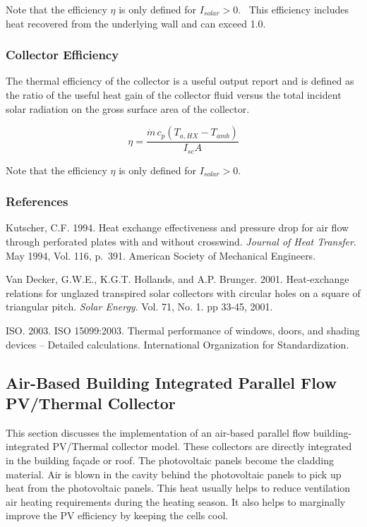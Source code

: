 Note that the efficiency \(\eta\) is only defined for \({I_{solar}} > 0\).~ This efficiency includes heat recovered from the underlying wall and can exceed 1.0.

\subsubsection{Collector Efficiency}\label{collector-efficiency}

The thermal efficiency of the collector is a useful output report and is defined as the ratio of the useful heat gain of the collector fluid versus the total incident solar radiation on the gross surface area of the collector.

\begin{equation}
\eta  = \frac{{\dot m\,{c_p}\left( {{T_{a,HX}} - {T_{amb}}} \right)}}{{{I_{sc}}A}}
\end{equation}

Note that the efficiency \(\eta\) is only defined for \({I_{solar}} > 0\).

\subsubsection{References}\label{references-3-004}

Kutscher, C.F. 1994. Heat exchange effectiveness and pressure drop for air flow through perforated plates with and without crosswind. \emph{Journal of Heat Transfer}. May 1994, Vol. 116, p.~391. American Society of Mechanical Engineers.

Van Decker, G.W.E., K.G.T. Hollands, and A.P. Brunger. 2001. Heat-exchange relations for unglazed transpired solar collectors with circular holes on a square of triangular pitch. \emph{Solar Energy}. Vol. 71, No. 1. pp 33-45, 2001.

ISO. 2003. ISO 15099:2003. Thermal performance of windows, doors, and shading devices -- Detailed calculations. International Organization for Standardization.

\subsection{Air-Based Building Integrated Parallel Flow PV/Thermal Collector}\label{building-integrated-pv-thermal-collector}
This section discusses the implementation of an air-based parallel flow building-integrated PV/Thermal collector model. These collectors are directly integrated in the building fa\c{c}ade or roof. The photovoltaic panels become the cladding material. Air is blown in the cavity behind the photovoltaic panels to pick up heat from the photovoltaic panels. This heat usually helps to reduce ventilation air heating requirements during the heating season. It also helps to marginally improve the PV efficiency by keeping the cells cool.

